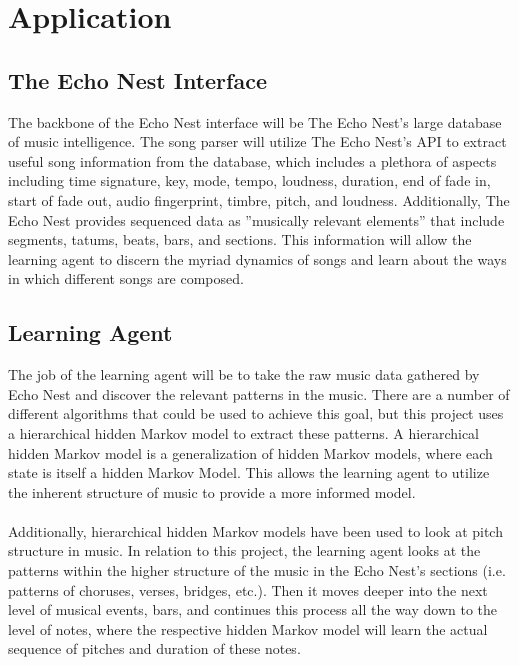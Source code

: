 \documentclass{article}
\begin{document}
\section{Application}
\subsection{The Echo Nest Interface}
The backbone of the Echo Nest interface will be The Echo Nest’s large database of music intelligence. The song parser will utilize The Echo Nest’s API to extract useful song information from the database, which includes a plethora of aspects including time signature, key, mode, tempo, loudness, duration, end of fade in, start of fade out, audio fingerprint, timbre, pitch, and loudness. Additionally, The Echo Nest provides sequenced data as ”musically relevant elements” that include segments, tatums, beats, bars, and sections.  This information will allow the learning agent to discern the myriad dynamics of songs and learn about the ways in which different songs are composed.

\subsection{Learning Agent}
The job of the learning agent will be to take the raw music data gathered by Echo Nest and discover the relevant patterns in the music. There are a number of different algorithms that could be used to achieve this goal, but this project uses a hierarchical hidden Markov model to extract these patterns. A hierarchical hidden Markov model is a generalization of hidden Markov models, where each state is itself a hidden Markov Model. \cite{Fine:1998:HHM:325865.325879} This allows the learning agent to utilize the inherent structure of music to provide a more informed model.\\
\\
Additionally, hierarchical hidden Markov models have been used to look at pitch structure in music.   \cite{_learningmusical} In relation to this project, the learning agent looks at the patterns within the higher structure of the music in the Echo Nest's sections (i.e. patterns of choruses, verses, bridges, etc.). Then it moves deeper into the next level of musical events, bars, and continues this process all the way down to the level of notes, where the respective hidden Markov model will learn the actual sequence of pitches and duration of these notes. 
\end{document}
